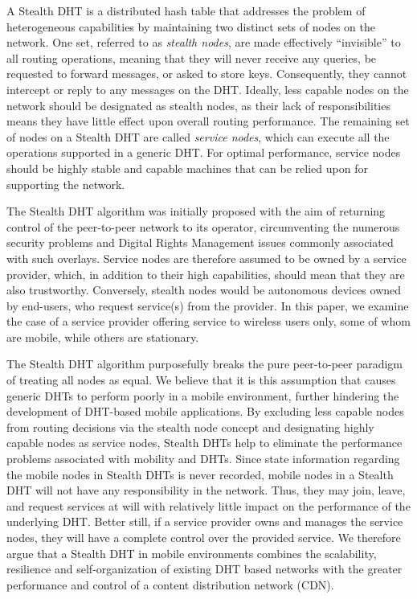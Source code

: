 \documentclass[conference]{IEEEtran}
\begin{document}
A Stealth DHT is a distributed hash table that addresses the problem
of heterogeneous capabilities by maintaining two distinct sets of
nodes on the network. One set, referred to as {\em stealth nodes},
are made effectively ``invisible'' to all routing operations,
meaning that they will never receive any queries, be requested to
forward messages, or asked to store keys. Consequently, they cannot
intercept or reply to any messages on the DHT. Ideally, less capable
nodes on the network should be designated as stealth nodes, as their
lack of responsibilities means they have little effect upon overall
routing performance. The remaining set of nodes on a Stealth DHT are
called {\em service nodes}, which can execute all the operations
supported in a generic DHT. For optimal performance, service nodes
should be highly stable and capable machines that can be relied upon
for supporting the network.

The Stealth DHT algorithm was initially proposed with the aim of
returning control of the peer-to-peer network to its operator,
circumventing the numerous security problems and Digital Rights
Management issues commonly associated with such overlays. Service
nodes are therefore assumed to be owned by a service provider,
which, in addition to their high capabilities, should mean that they
are also trustworthy. Conversely, stealth nodes would be autonomous
devices owned by end-users, who request service(s) from the
provider. In this paper, we examine the case of a service provider
offering service to wireless users only, some of whom are mobile,
while others are stationary.

The Stealth DHT algorithm purposefully breaks the pure peer-to-peer
paradigm of treating all nodes as equal. We believe that it is this
assumption that causes generic DHTs to perform poorly in a mobile
environment, further hindering the development of DHT-based mobile
applications. By excluding less capable nodes from routing decisions
via the stealth node concept and designating highly capable nodes as
service nodes, Stealth DHTs help to eliminate the performance
problems associated with mobility and DHTs. Since state information
regarding the mobile nodes in Stealth DHTs is never recorded, mobile
nodes in a Stealth DHT will not have any responsibility in the
network. Thus, they may join, leave, and request services at will
with relatively little impact on the performance of the underlying
DHT. Better still, if a service provider owns and manages the
service nodes, they will have a complete control over the provided
service. We therefore argue that a Stealth DHT in mobile
environments combines the scalability, resilience and
self-organization of existing DHT based networks with the greater
performance and control of a content distribution network (CDN).
\end{document}
